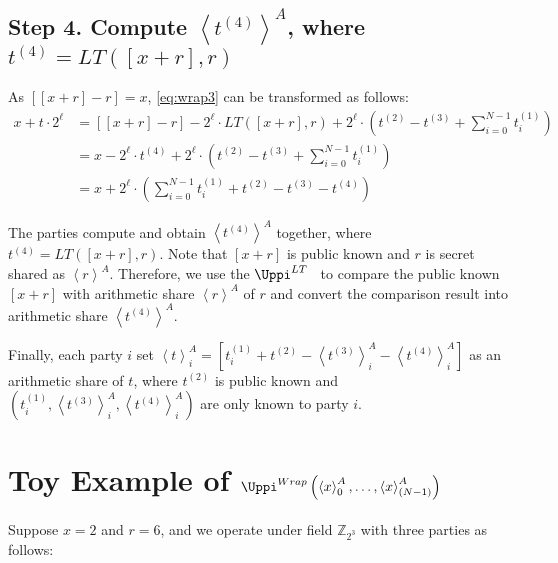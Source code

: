 \subsection{Step 4. Compute $\left\langle t^{\left(4\right) }\right\rangle^A $, where $t^{\left(4\right) }=LT\left(\left[x+r  \right] ,  r  \right) $}
\label{wrap:step4}

As $\left[ \left[x+r\right]   -r \right]=x$, \autoref{eq:wrap3} can be transformed as follows:
\begin{equation}
    \label{eq:wrap4}
    \begin{split}
        x + t\cdot 2^{\ell} &=  \left[ \left[x+r\right]   -r \right]     -2^{\ell} \cdot LT\left( \left[x+r  \right] ,r\right)+2^{\ell}\cdot \left(t^{(2)}  -  t^{\left(3\right) } +\sum_{i=0}^{N-1} t^{(1)}_i\right)\\
        &= x-2^{\ell} \cdot t^{\left(4\right) }+2^{\ell}\cdot \left(t^{(2)}  -  t^{\left(3\right) } +\sum_{i=0}^{N-1} t^{(1)}_i\right)\\
        &= x +2^{\ell}\cdot \left(\sum_{i=0}^{N-1} t^{(1)}_i+t^{(2)}  -  t^{\left(3\right)} -t^{\left(4\right) } \right)
    \end{split}
\end{equation}

The parties compute and obtain $\left\langle t^{\left(4\right) }\right\rangle^A $ together, where $t^{\left(4\right) }=LT\left(\left[x+r  \right] ,r\right) $. Note that $\left[x+r  \right] $ is public known and $r$ is secret shared as $\left\langle r\right\rangle^A $. Therefore, we use the $\Uppi^{LT}$~\cite{cryptoeprint:2021:119} to compare the public known $ \left[x+r  \right] $ with arithmetic share $\left\langle r\right\rangle ^A $ of $r$ and convert the comparison result into arithmetic share $\left\langle t^{\left(4\right) }\right\rangle^A$.

Finally, each party $i$ set $\left\langle t\right\rangle^A_i =\left[t^{(1)}_i+t^{\left(2\right) }-\left\langle t^{(3)}\right\rangle^A_i-\left\langle t^{(4)}\right\rangle^A_i \right] $ as an arithmetic share of $t$, where $t^{(2)}$ is public known and $\left(t_i^{\left(1\right) },\left\langle t^{(3)}\right\rangle^A_i,\left\langle t^{(4)}\right\rangle^A_i\right) $ are only known to party $i$.


\section{Toy Example of $\Uppi^{Wrap}\left(\left\langle x\right\rangle_0^A, \ldots ,\left\langle x\right\rangle_{\left(N-1\right)}^A  \right) $}
Suppose $x=2$ and $r=6$, and we operate under field $\mathbb{Z} _{2^{3}}$ with three parties as follows:

